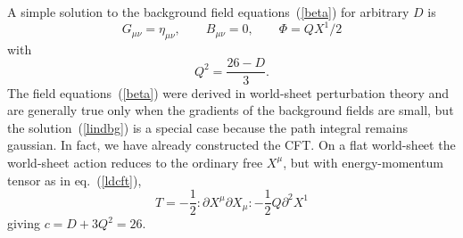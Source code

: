 A simple solution to the background field equations~(\ref{beta}) for
arbitrary $D$ is~\cite{Mdil}
\begin{equation}
G_{\mu\nu} = \eta_{\mu\nu}, \qquad B_{\mu\nu} = 0, \qquad
\Phi = Q X^1/2 \label{lindbg}
\end{equation}
with
\begin{equation}
Q^2 = \frac{26 - D}{3}.
\end{equation}
The field equations~(\ref{beta}) were derived in world-sheet
perturbation theory and are generally true only when the gradients
of the background fields are small, but the solution~(\ref{lindbg}) is
a special case because the path integral remains gaussian.  In fact,
we have already constructed the CFT.
On a flat world-sheet the
world-sheet action reduces to the ordinary free $X^\mu$, but with
energy-momentum tensor as in eq.~(\ref{ldcft}),  
\begin{equation}
T = -\frac{1}{2} :\! \partial X^\mu \partial X_\mu \!: -
\frac{1}{2} Q \partial^2 X^1 
\end{equation}
giving $c = D + 3 Q^2 = 26$.

